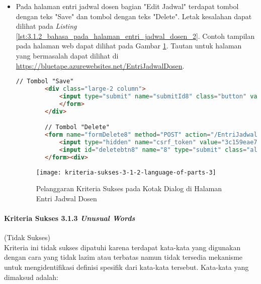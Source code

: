 \begin{itemize}
    \item Pada halaman entri jadwal dosen bagian "Edit Jadwal" terdapat tombol dengan teks "Save" dan tombol dengan teks "Delete". Letak kesalahan dapat dilihat pada \textit{Listing} \ref{lst:3.1.2_bahasa_pada_halaman_entri_jadwal_dosen_2}. Contoh tampilan pada halaman web dapat dilihat pada Gambar \ref{fig:3.1.2_language_of_parts_3}. Tautan untuk halaman yang bermasalah dapat dilihat di \url{https://bluetape.azurewebsites.net/EntriJadwalDosen}.
    \begin{lstlisting}[frame=single, label={lst:3.1.2_bahasa_pada_halaman_entri_jadwal_dosen_2}, language=HTML, caption=Pelanggaran Kriteria Sukses 3.1.2 pada Kotak Dialog di Halaman Entri Jadwal Dosen]
        // Tombol "Save"
        <div class="large-2 column">
            <input type="submit" name="submitId8" class="button" value="Save">
            </form>
        </div>

        // Tombol "Delete"
        <form name="formDelete8" method="POST" action="/EntriJadwalDosen/delete/8">    
            <input type="hidden" name="csrf_token" value="3c159eae7bc953dd591b679c080ed066"/>
            <input id="deletebtn8" name="8" type="submit" class="alert button" value="Delete">
        </form><div>
    \end{lstlisting}
    
    \begin{figure}[H]
        \centering  
        \texttt{[image: kriteria-sukses-3-1-2-language-of-parts-3]}  
        \caption[Pelanggaran Kriteria Sukses 3.1.2 pada Kotak Dialog di Halaman Entri Jadwal Dosen]{Pelanggaran Kriteria Sukses pada Kotak Dialog di Halaman Entri Jadwal Dosen}
        \label{fig:3.1.2_language_of_parts_3}  
    \end{figure}
\end{itemize}

\paragraph{Kriteria Sukses 3.1.3 \textit{Unusual Words}}
\label{par:kepatuhan_bluetape_kriteria_sukses_3.1.3}
(Tidak Sukses)\\

Kriteria ini tidak sukses dipatuhi karena terdapat kata-kata yang digunakan dengan cara yang tidak lazim atau terbatas namun tidak tersedia mekanisme untuk mengidentifikasi definisi spesifik dari kata-kata tersebut. Kata-kata yang dimaksud adalah:

